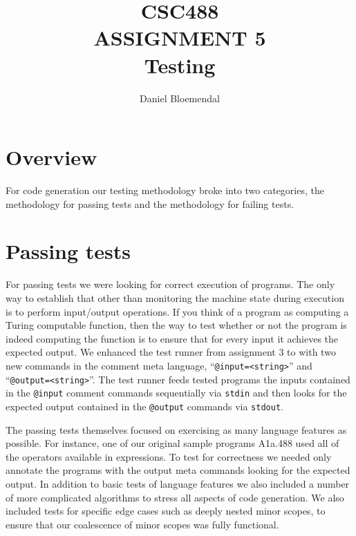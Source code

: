 \documentclass[oneside]{amsart}
\theoremstyle{definition}
\theoremstyle{remark}
\numberwithin{equation}{section}
\begin{document}
\title[CSC488 A5]{CSC488\\ASSIGNMENT 5\\Testing}
\author{Daniel Bloemendal}

\begin{titlepage}
\maketitle
\thispagestyle{empty}
\tableofcontents
\end{titlepage}

\section{Overview}
For code generation our testing methodology broke into two categories, the methodology for passing
tests and the methodology for failing tests.

\section{Passing tests}
For passing tests we were looking for correct execution of programs. The only way to establish that
other than monitoring the machine state during execution is to perform input/output operations. If
you think of a program as computing a Turing computable function, then the way to test whether or
not the program is indeed computing the function is to ensure that for every input it achieves the
expected output. We enhanced the test runner from assignment 3 to with two new commands in the
comment meta language, ``\texttt{@input=<string>}'' and ``\texttt{@output=<string>}''. The test runner
feeds tested programs the inputs contained in the \texttt{@input} comment commands sequentially via
\texttt{stdin} and then looks for the expected output contained in the \texttt{@output} commands via
\texttt{stdout}.

The passing tests themselves focused on exercising as many language features as possible. For
instance, one of our original sample programs A1a.488 used all of the operators available in
expressions. To test for correctness we needed only annotate the programs with the output meta
commands looking for the expected output. In addition to basic tests of language features we also
included a number of more complicated algorithms to stress all aspects of code generation. We also
included tests for specific edge cases such as deeply nested minor scopes, to ensure that our
coalescence of minor scopes was fully functional.
\end{document}
